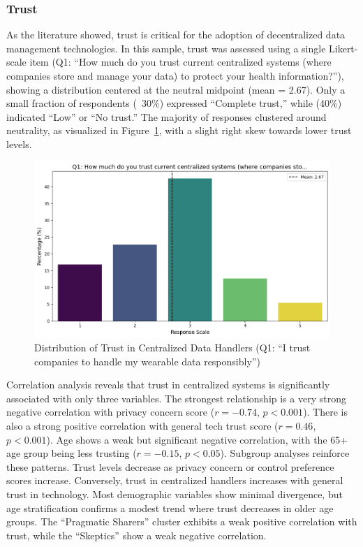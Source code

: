 	\subsubsection{Trust}
		As the literature showed, trust is critical for the adoption of decentralized data management technologies. In this sample, trust was assessed using a single Likert-scale item (Q1: “How much do you trust current centralized systems (where companies store and manage your data) to protect your health information?”), showing a distribution centered at the neutral midpoint (mean = 2.67). Only a small fraction of respondents (~30\%) expressed “Complete trust,” while (40\%) indicated “Low” or “No trust.” The majority of responses clustered around neutrality, as visualized in Figure~\ref{fig:trust_q1}, with a slight right skew towards lower trust levels. 
		\begin{figure}[h!]\centering
			\includegraphics[width=0.7\linewidth]{figures/questions/Q1_likert.png}
			\caption{Distribution of Trust in Centralized Data Handlers (Q1: ``I trust companies to handle my wearable data responsibly'')}
			\label{fig:trust_q1}
		\end{figure}
		Correlation analysis reveals that trust in centralized systems is significantly associated with only three variables. The strongest relationship is a very strong negative correlation with privacy concern score ($r = -0.74$, $p < 0.001$). There is also a strong positive correlation with general tech trust score ($r = 0.46$, $p < 0.001$). Age shows a weak but significant negative correlation, with the 65+ age group being less trusting ($r = -0.15$, $p < 0.05$).
		Subgroup analyses reinforce these patterns. Trust levels decrease as privacy concern or control preference scores increase. Conversely, trust in centralized handlers increases with general trust in technology. Most demographic variables show minimal divergence, but age stratification confirms a modest trend where trust decreases in older age groups. The ``Pragmatic Sharers'' cluster exhibits a weak positive correlation with trust, while the ``Skeptics'' show a weak negative correlation.

